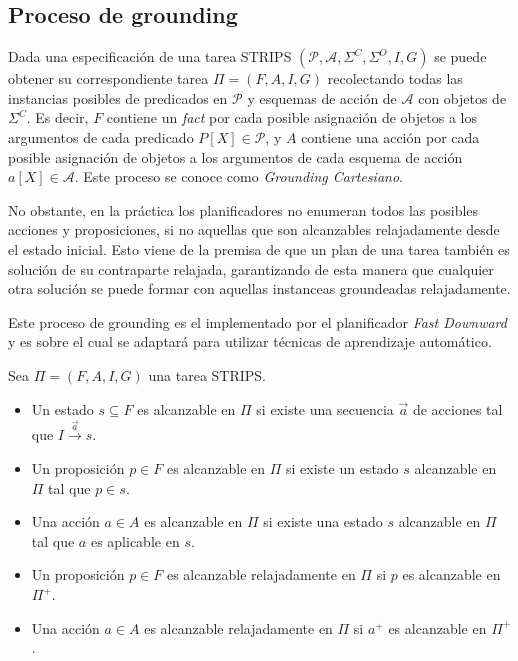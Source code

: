 \subsection{Proceso de grounding}

Dada una especificación de una tarea STRIPS $(\mathcal{P}, \mathcal{A},
\Sigma^{C}, \Sigma^{O}, I, G)$ se puede obtener su correspondiente tarea $\Pi =
(F, A, I, G)$ recolectando todas las instancias posibles de predicados en
$\mathcal{P}$ y esquemas de acción de $\mathcal{A}$ con objetos de $\Sigma^{C}$.
Es decir, $F$ contiene un \emph{fact} por cada posible asignación de objetos a
los argumentos de cada predicado $P[X] \in \mathcal{P}$, y $A$ contiene una
acción por cada posible asignación de objetos a los argumentos de cada esquema
de acción $a[X] \in \mathcal{A}$. Este proceso se conoce como \emph{Grounding
Cartesiano}.

No obstante, en la práctica los planificadores no enumeran todos las posibles
acciones y proposiciones, si no aquellas que son alcanzables relajadamente desde
el estado inicial. Esto viene de la premisa de que un plan de una tarea también
es solución de su contraparte relajada, garantizando de esta manera que
cualquier otra solución se puede formar con aquellas instanceas groundeadas
relajadamente.

Este proceso de grounding es el implementado por el planificador \emph{Fast
Downward} \citep{Helmert-2011} y es sobre el cual se adaptará para utilizar
técnicas de aprendizaje automático.

\begin{mydef}
    Sea $\Pi = (F, A, I, G)$ una tarea STRIPS.    
    \begin{itemize}
        \item Un estado $s \subseteq F$ es alcanzable en $\Pi$ si existe una
        secuencia $\vec{a}$ de acciones tal que $I \xrightarrow{\vec{a}} s$.
    
        \item Un proposición $p \in F$ es alcanzable en $\Pi$ si existe un estado
        $s$ alcanzable en $\Pi$ tal que $p \in s$.

        \item Una acción $a \in A$ es alcanzable en $\Pi$ si existe una estado $s$
        alcanzable en $\Pi$ tal que $a$ es aplicable en $s$.

        \item Un proposición $p \in F$ es alcanzable relajadamente en $\Pi$ si
        $p$ es alcanzable en $\Pi^{+}$.

        \item Una acción $a \in A$ es alcanzable relajadamente en $\Pi$ si
        $a^{+}$ es alcanzable en $\Pi^{+}$.
    \end{itemize}
\end{mydef}



